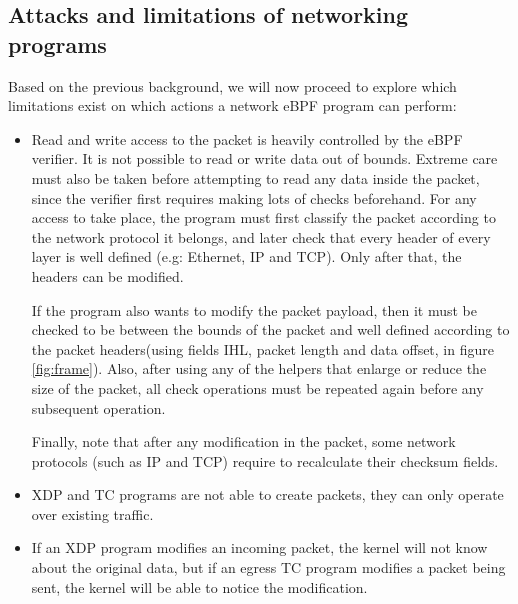 \documentclass[12pt]{report} %
\begin{document}
\subsection{Attacks and limitations of networking programs}
Based on the previous background, we will now proceed to explore which limitations exist on which actions a network eBPF program can perform:
\begin{itemize}
\item Read and write access to the packet is heavily controlled by the eBPF verifier. It is not possible to read or write data out of bounds. Extreme care must also be taken before attempting to read any data inside the packet, since the verifier first requires making lots of checks beforehand. For any access to take place, the program must first classify the packet according to the network protocol it belongs, and later check that every header of every layer is well defined (e.g: Ethernet, IP and TCP). Only after that, the headers can be modified. 

If the program also wants to modify the packet payload, then it must be checked to be between the bounds of the packet and well defined according to the packet headers(using fields IHL, packet length and data offset, in figure \ref{fig:frame}). Also, after using any of the helpers that enlarge or reduce the size of the packet, all check operations must be repeated again before any subsequent operation.

Finally, note that after any modification in the packet, some network protocols (such as IP and TCP) require to recalculate their checksum fields. 

\item XDP and TC programs are not able to create packets, they can only operate over existing traffic.

\item If an XDP program modifies an incoming packet, the kernel will not know about the original data, but if an egress TC program modifies a packet being sent, the kernel will be able to notice the modification.
\end{itemize}
\end{document}
